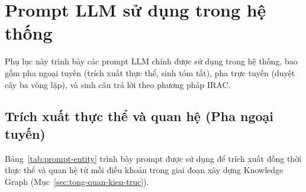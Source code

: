 \chapter{Prompt LLM sử dụng trong hệ thống}
\label{app:prompt-llm}

Phụ lục này trình bày các prompt LLM chính được sử dụng trong hệ thống, bao gồm
pha ngoại tuyến (trích xuất thực thể, sinh tóm tắt), pha trực tuyến (duyệt cây ba vòng
lặp), và sinh câu trả lời theo phương pháp IRAC.

\section{Trích xuất thực thể và quan hệ (Pha ngoại tuyến)}
\label{sec:app-prompt-entity}

Bảng~\ref{tab:prompt-entity} trình bày prompt được sử dụng để trích xuất đồng thời thực thể và quan hệ từ mỗi điều
khoản trong giai đoạn xây dựng Knowledge Graph (Mục~\ref{sec:tong-quan-kien-truc}).

